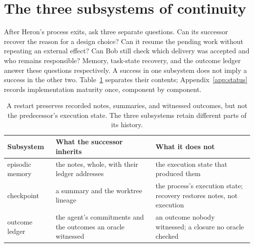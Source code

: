 \documentclass[11pt,a4paper]{article}
\theoremstyle{definition}
\begin{document}
\section{The three subsystems of continuity}\label{sec:organs}

After Heron's process exits, ask three separate questions. Can its successor
recover the reason for a design choice? Can it resume the pending work without
repeating an external effect? Can Bob still check which delivery was accepted
and who remains responsible? Memory, task-state recovery, and the outcome ledger
answer these questions respectively. A success in one subsystem does not imply a
success in the other two. Table~\ref{tab:stp-organs} separates their contents;
Appendix~\ref{app:status} records implementation maturity once, component by
component.

\begin{table}[!t]
\centering
\caption{A restart preserves recorded notes, summaries, and witnessed outcomes, but not the predecessor's execution state. The three subsystems retain different parts of its history.}
\label{tab:stp-organs}
\small
\renewcommand{\arraystretch}{1.15}
\begin{tabularx}{\linewidth}{@{}l >{\raggedright\arraybackslash}X >{\raggedright\arraybackslash}X@{}}
\toprule
\textbf{Subsystem} & \textbf{What the successor inherits} & \textbf{What it does not} \\
\midrule
episodic memory & the notes, whole, with their ledger addresses & the execution state that produced them \\
checkpoint & a summary and the worktree lineage & the process's execution state; recovery restores notes, not execution \\
outcome ledger & the agent's commitments and the outcomes an oracle witnessed & an outcome nobody witnessed; a closure no oracle checked \\
\bottomrule
\end{tabularx}
\end{table}
\end{document}
